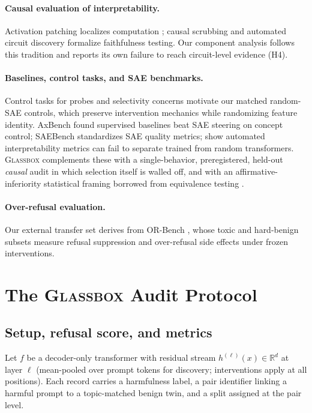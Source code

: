 \documentclass[11pt]{article}
\newcommand{\glassbox}{\textsc{Glassbox}}
\begin{document}
\paragraph{Causal evaluation of interpretability.}
Activation patching localizes computation \citep{meng2022locating}; causal
scrubbing \citep{chan2022causal} and automated circuit discovery
\citep{conmy2023towards,syed2024attribution} formalize faithfulness testing.
Our component analysis follows this tradition and reports its own failure to
reach circuit-level evidence (H4).

\paragraph{Baselines, control tasks, and SAE benchmarks.}
Control tasks for probes \citep{hewitt2019designing} and selectivity concerns
\citep{belinkov2022probing} motivate our matched random-SAE controls, which
preserve intervention mechanics while randomizing feature identity.
AxBench \citep{wu2025axbench} found supervised baselines beat SAE steering on
concept control; SAEBench \citep{karvonen2025saebench} standardizes SAE
quality metrics; \citet{heap2025automated} show automated interpretability
metrics can fail to separate trained from random transformers.  \glassbox{}
complements these with a single-behavior, preregistered, held-out
\emph{causal} audit in which selection itself is walled off, and with an
affirmative-inferiority statistical framing borrowed from equivalence testing
\citep{schuirmann1987comparison,lakens2017equivalence}.

\paragraph{Over-refusal evaluation.}
Our external transfer set derives from OR-Bench \citep{cui2025orbench}, whose
toxic and hard-benign subsets measure refusal suppression and over-refusal
side effects under frozen interventions.

\section{The \glassbox{} Audit Protocol}
\label{sec:protocol}

\subsection{Setup, refusal score, and metrics}
\label{sec:setup}

Let $f$ be a decoder-only transformer with residual stream
$h^{(\ell)}(x)\in\mathbb{R}^{d}$ at layer $\ell$ (mean-pooled over prompt
tokens for discovery; interventions apply at all positions).  Each record
carries a harmfulness label, a pair identifier linking a harmful prompt to a
topic-matched benign twin, and a split assigned at the pair level.
\end{document}
